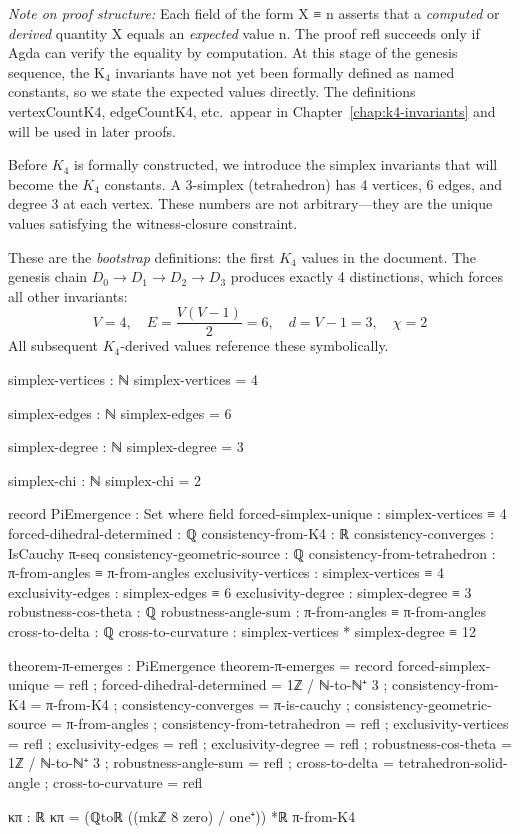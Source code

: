 \documentclass[11pt,a4paper]{book}
\def\texttt#1{#1}%
\begin{document}
\medskip
\noindent\textit{Note on proof structure:} Each field of the form \texttt{X ≡ n} asserts that 
a \emph{computed} or \emph{derived} quantity \texttt{X} equals an \emph{expected} value \texttt{n}.
The proof \texttt{refl} succeeds only if Agda can verify the equality by computation.
At this stage of the genesis sequence, the K$_4$ invariants have not yet been formally defined 
as named constants, so we state the expected values directly. The definitions 
\texttt{vertexCountK4}, \texttt{edgeCountK4}, etc.\ appear in Chapter~\ref{chap:k4-invariants} 
and will be used in later proofs.

Before $K_4$ is formally constructed, we introduce the simplex invariants that will 
become the $K_4$ constants. A 3-simplex (tetrahedron) has 4 vertices, 6 edges, and 
degree 3 at each vertex. These numbers are not arbitrary---they are the unique values 
satisfying the witness-closure constraint.

These are the \emph{bootstrap} definitions: the first $K_4$ values in the document.
The genesis chain $D_0 \to D_1 \to D_2 \to D_3$ produces exactly 4 distinctions,
which forces all other invariants:
\[
V = 4, \quad E = \frac{V(V-1)}{2} = 6, \quad d = V-1 = 3, \quad \chi = 2
\]
All subsequent $K_4$-derived values reference these symbolically.

\begin{code}
simplex-vertices : ℕ
simplex-vertices = 4

simplex-edges : ℕ
simplex-edges = 6

simplex-degree : ℕ
simplex-degree = 3

simplex-chi : ℕ
simplex-chi = 2

record PiEmergence : Set where
  field
    forced-simplex-unique      : simplex-vertices ≡ 4
    forced-dihedral-determined : ℚ
    consistency-from-K4        : ℝ
    consistency-converges      : IsCauchy π-seq
    consistency-geometric-source : ℚ
    consistency-from-tetrahedron : π-from-angles ≡ π-from-angles
    exclusivity-vertices : simplex-vertices ≡ 4
    exclusivity-edges    : simplex-edges ≡ 6
    exclusivity-degree   : simplex-degree ≡ 3
    robustness-cos-theta : ℚ
    robustness-angle-sum : π-from-angles ≡ π-from-angles
    cross-to-delta       : ℚ
    cross-to-curvature   : simplex-vertices * simplex-degree ≡ 12

theorem-π-emerges : PiEmergence
theorem-π-emerges = record
  { forced-simplex-unique = refl
  ; forced-dihedral-determined = 1ℤ / ℕ-to-ℕ⁺ 3
  ; consistency-from-K4 = π-from-K4
  ; consistency-converges = π-is-cauchy
  ; consistency-geometric-source = π-from-angles
  ; consistency-from-tetrahedron = refl
  ; exclusivity-vertices = refl
  ; exclusivity-edges = refl
  ; exclusivity-degree = refl
  ; robustness-cos-theta = 1ℤ / ℕ-to-ℕ⁺ 3
  ; robustness-angle-sum = refl
  ; cross-to-delta = tetrahedron-solid-angle
  ; cross-to-curvature = refl
  }

κπ : ℝ
κπ = (ℚtoℝ ((mkℤ 8 zero) / one⁺)) *ℝ π-from-K4
\end{code}
\end{document}
